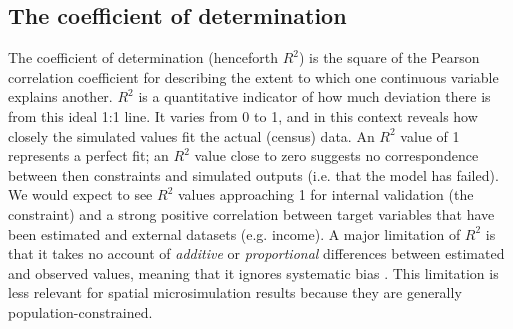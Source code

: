 \documentclass[a4paper,10pt]{article}
\begin{document}
\subsection{The coefficient of determination}
The coefficient of determination (henceforth $R^2$) is the 
square of the Pearson correlation coefficient for describing the
extent to which one continuous variable explains another.
$R^2$ is a quantitative
indicator of how much deviation there is from this ideal
1:1 line. It varies from 0 to 1,
and in this context reveals how closely the 
simulated values fit the actual (census) data.
An $R^2$ value of 1 represents a perfect fit; an $R^2$ value
close to zero suggests no correspondence
between then constraints and simulated outputs (i.e. that the model has failed).
We would expect to see $R^2$ values approaching 1 for
internal validation (the constraint) and a strong
positive correlation between target variables that have been estimated and
external datasets (e.g. income). A major limitation of $R^2$ is that
it takes no account of \emph{additive} or \emph{proportional} differences
between estimated and observed values, meaning that it ignores systematic
bias \citep{Legates1999GOF}. This limitation is less relevant for spatial microsimulation results
because they are generally population-constrained. 



\end{document}
